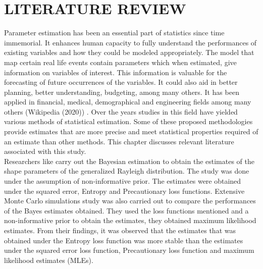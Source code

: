 \documentclass[a4paper,12pt]{report}
\newcommand{\para}{\hspace{0.5cm}}
\begin{document}
\chapter{LITERATURE REVIEW}
\justifying

\noindent\para Parameter estimation has been an essential part of statistics since time immemorial. It enhances human capacity to fully understand the performances of existing variables and how they could be modeled appropriately. The model that map certain real life events contain parameters which when estimated, give information on variables of interest. This information is valuable for the forecasting of future occurrences of the variables. It could also aid in better planning, better understanding, budgeting, among many others. It has been applied in financial, medical, demographical and engineering fields among many others (Wikipedia (2020)) \nocite{wiki}. Over the years studies in this field have yielded various methods of statistical estimation. Some of these proposed methodologies provide estimates that are more precise and meet statistical properties required of an estimate than other methods. This chapter discusses relevant literature associated with this study.\\

\noindent\para Researchers like \cite{aliyu2016bayesian} carry out the Bayesian estimation to obtain the estimates of the shape parameters of the generalized Rayleigh distribution. The study was done under the assumption of non-informative prior. The estimates were obtained under the squared error, Entropy and Precautionary loss functions. Extensive Monte Carlo simulations study was also carried out to compare the performances of the Bayes estimates obtained. They used the loss functions mentioned and a non-informative prior to obtain the estimates, they obtained maximum likelihood estimates. From their findings, it was observed that the estimates that was obtained under the Entropy loss function was more stable than the estimates under the squared error loss function, Precautionary loss function and maximum likelihood estimates (MLEs).\\
\end{document}
